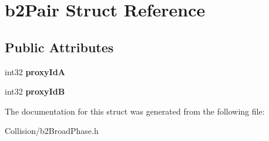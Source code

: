 \hypertarget{structb2Pair}{}\section{b2\+Pair Struct Reference}
\label{structb2Pair}
\subsection*{Public Attributes}
\begin{DoxyCompactItemize}
\item 
\mbox{\label{structb2Pair_abae3df5e877cf0c4611334e3eec4b84c}} 
int32 {\bfseries proxy\+IdA}
\item 
\mbox{\label{structb2Pair_af2bd888ccb34535ab9126497349da749}} 
int32 {\bfseries proxy\+IdB}
\end{DoxyCompactItemize}


The documentation for this struct was generated from the following file\+:\begin{DoxyCompactItemize}
\item 
Collision/b2\+Broad\+Phase.\+h\end{DoxyCompactItemize}
